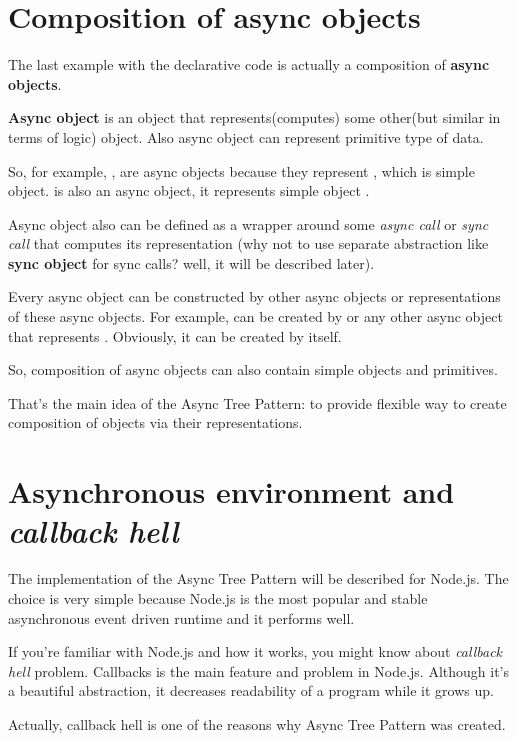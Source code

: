 \documentclass{article}
\newcommand{\cit}[1]{{\fontfamily{qcr}\selectfont{\textcolor{superdarkgray}{#1}}}}
\begin{document}
\section{Composition of async objects}

The last example with the declarative code is actually a composition of \textbf{async objects}.

\textbf{Async object} is an object that represents(computes) some other(but similar in terms of logic) object. Also async object can represent primitive type of data.

So, for example, \cit{SavedAccount}, \cit{CreatedAccount} are async objects because they represent \cit{Account}, which is simple object. \cit{UserFromDb} is also an async object, it represents simple object \cit{User}.

Async object also can be defined as a wrapper around some \textit{async call} or \textit{sync call} that computes its representation (why not to use separate abstraction like \textbf{sync object} for sync calls? well, it will be described later).

Every async object can be constructed by other async objects or representations of these async objects. For example, \cit{SavedAccount} can be created by \cit{CreatedAccount} or any other async object that represents \cit{Account}. Obviously, it can be created by \cit{Account} itself.

So, composition of async objects can also contain simple objects and primitives.

That's the main idea of the Async Tree Pattern: to provide flexible way to create composition of objects via their representations.

\section{Asynchronous environment and \textit{callback hell}}

The implementation of the Async Tree Pattern will be described for Node.js. The choice is very simple because Node.js is the most popular and stable asynchronous  event driven runtime and it performs well.

If you're familiar with Node.js and how it works, you might know about \textit{callback hell} problem. Callbacks is the main feature and problem in Node.js. Although it's a beautiful abstraction, it decreases readability of a program while it grows up.

Actually, callback hell is one of the reasons why Async Tree Pattern was created.
\end{document}
